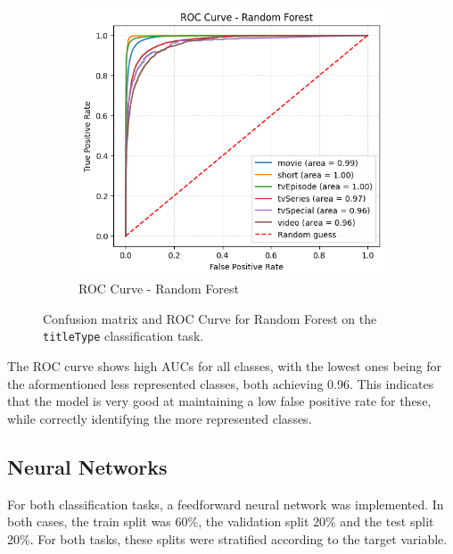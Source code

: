 \begin{figure}[H]
\begin{subfigure}[b]{0.50\textwidth}
        \includegraphics[width=\textwidth]{plotsss/roc_rf_titletype}
        \caption{ROC Curve - Random Forest}
        \label{fig:roc_rf}
    \end{subfigure}
    \caption{Confusion matrix and ROC Curve for Random Forest on the \texttt{titleType} classification task.}
    \label{fig:cm_comparison}
\end{figure}

The ROC curve shows high AUCs for all classes, with the lowest ones
being for the aformentioned less represented classes, both
achieving 0.96. This indicates that the model is very good at
maintaining a low false positive rate for these, while
correctly identifying the more represented classes.


\subsection{Neural Networks}

For both classification tasks, a feedforward neural network was
implemented.
In both cases, the train split was 60\%, the validation split
20\% and the test split 20\%. For both tasks, these splits
were stratified according to the target variable.


